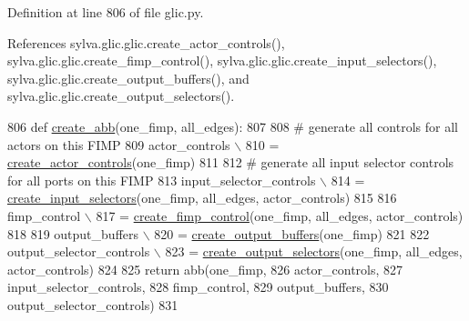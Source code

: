 Definition at line 806 of file glic.\+py.



References sylva.\+glic.\+glic.\+create\+\_\+actor\+\_\+controls(), sylva.\+glic.\+glic.\+create\+\_\+fimp\+\_\+control(), sylva.\+glic.\+glic.\+create\+\_\+input\+\_\+selectors(), sylva.\+glic.\+glic.\+create\+\_\+output\+\_\+buffers(), and sylva.\+glic.\+glic.\+create\+\_\+output\+\_\+selectors().


\begin{DoxyCode}
806     \textcolor{keyword}{def }\hyperlink{namespacesylva_1_1glic_1_1glic_a3a984424c11a0b4b6ac8890135ccbfe9}{create\_abb}(one\_fimp, all\_edges):
807 
808         \textcolor{comment}{# generate all controls for all actors on this FIMP}
809         actor\_controls \(\backslash\)
810             = \hyperlink{namespacesylva_1_1glic_1_1glic_a0b179ee41ee4494cf7450be4ca272db4}{create\_actor\_controls}(one\_fimp)
811 
812         \textcolor{comment}{# generate all input selector controls for all ports on this FIMP}
813         input\_selector\_controls \(\backslash\)
814             = \hyperlink{namespacesylva_1_1glic_1_1glic_a28f028a55874a8d890d0df58905da73b}{create\_input\_selectors}(one\_fimp, all\_edges, actor\_controls)
815 
816         fimp\_control \(\backslash\)
817             = \hyperlink{namespacesylva_1_1glic_1_1glic_a1cdd3394b53489429bc51c8206e1180e}{create\_fimp\_control}(one\_fimp, all\_edges, actor\_controls)
818 
819         output\_buffers \(\backslash\)
820             = \hyperlink{namespacesylva_1_1glic_1_1glic_a53c55762a3c7d476be7ee748baeccbeb}{create\_output\_buffers}(one\_fimp)
821 
822         output\_selector\_controls \(\backslash\)
823             = \hyperlink{namespacesylva_1_1glic_1_1glic_a7eb9347832747ffffb52851a1ee2d08f}{create\_output\_selectors}(one\_fimp, all\_edges, actor\_controls)
824 
825         \textcolor{keywordflow}{return} abb(one\_fimp,
826                    actor\_controls,
827                    input\_selector\_controls,
828                    fimp\_control,
829                    output\_buffers,
830                    output\_selector\_controls)
831 \end{DoxyCode}
\mbox{\label{namespacesylva_1_1glic_1_1glic_ae31a233cafcb3a83bd369c491b133b91}} 
